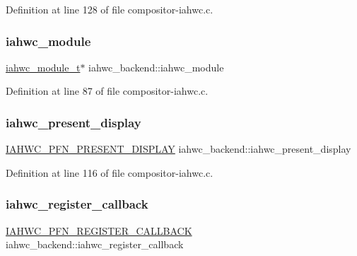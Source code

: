 Definition at line 128 of file compositor-\/iahwc.\+c.

\mbox{\label{structiahwc__backend_a2461d5cf72f5c1a53021d8a0cfc13ced}} 
\subsubsection{\texorpdfstring{iahwc\+\_\+module}{iahwc\_module}}
{\footnotesize\ttfamily \mbox{\hyperlink{iahwc_8h_a6a0009d570fc041f403dee1e0fd68cf9}{iahwc\+\_\+module\+\_\+t}}$\ast$ iahwc\+\_\+backend\+::iahwc\+\_\+module}



Definition at line 87 of file compositor-\/iahwc.\+c.

\mbox{\label{structiahwc__backend_a88fa0cf8eac2b62782be05e11116658e}} 
\subsubsection{\texorpdfstring{iahwc\+\_\+present\+\_\+display}{iahwc\_present\_display}}
{\footnotesize\ttfamily \mbox{\hyperlink{iahwc_8h_a1415d2bd6d7268e5a19569bea1253d53}{I\+A\+H\+W\+C\+\_\+\+P\+F\+N\+\_\+\+P\+R\+E\+S\+E\+N\+T\+\_\+\+D\+I\+S\+P\+L\+AY}} iahwc\+\_\+backend\+::iahwc\+\_\+present\+\_\+display}



Definition at line 116 of file compositor-\/iahwc.\+c.

\mbox{\label{structiahwc__backend_a0a12d7395fba844cdfd4ffc2093e80fe}} 
\subsubsection{\texorpdfstring{iahwc\+\_\+register\+\_\+callback}{iahwc\_register\_callback}}
{\footnotesize\ttfamily \mbox{\hyperlink{iahwc_8h_a6cf69c9a3a26fbdf5fec62d16485e5cf}{I\+A\+H\+W\+C\+\_\+\+P\+F\+N\+\_\+\+R\+E\+G\+I\+S\+T\+E\+R\+\_\+\+C\+A\+L\+L\+B\+A\+CK}} iahwc\+\_\+backend\+::iahwc\+\_\+register\+\_\+callback}



